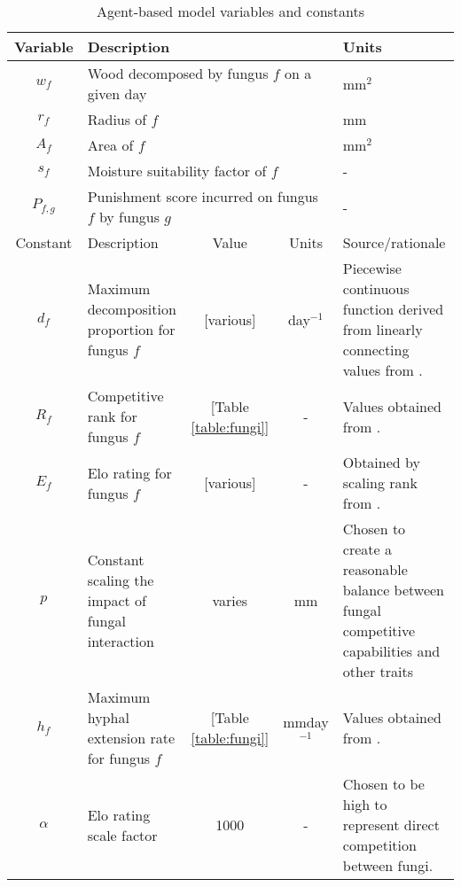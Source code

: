 \documentclass[12pt]{article}
\begin{document}

\begin{table}[!ht]
\centering
\caption{Agent-based model variables and constants}
\begin{tabular}[t]{cp{2in}ccp{1.8in}}
\hline
Variable &\multicolumn{3}{l}{Description}&Units\\
\hline
$w_f$&\multicolumn{3}{l}{Wood decomposed by fungus $f$ on a given day } &mm$^{2}$\\
$r_f$&\multicolumn{3}{l}{Radius of $f$}& mm\\
$A_f$&\multicolumn{3}{l}{Area of $f$}&mm$^2$\\
$s_f$&\multicolumn{3}{l}{Moisture suitability factor of $f$}&-\\  
$P_{f,g}$&\multicolumn{3}{l}{Punishment score incurred on fungus $f$ by fungus $g$}&-\\
\hline
Constant &Description&Value&Units&Source/rationale\\
\hline
$d_f$&Maximum decomposition proportion for fungus $f$ & [various] & day$^{-1}$ & Piecewise continuous function derived from linearly connecting values from \cite{trait-based}. \\
$R_f$&Competitive rank for fungus $f$ &[Table \ref{table:fungi}]&-&Values obtained from \cite{consistent_tradeoffs}.\\
$E_f$&Elo rating for fungus $f$ &[various]&-&Obtained by scaling rank from
\cite{consistent_tradeoffs}.\\
$p$&Constant scaling the impact of fungal interaction & varies & mm & Chosen to create a reasonable balance between fungal competitive capabilities and other traits \\
$h_f$&Maximum hyphal extension rate for fungus $f$ & [Table \ref{table:fungi}] & mm\;day$^{-1}$ & Values obtained from \cite{consistent_tradeoffs}.\\
$\alpha$ & Elo rating scale factor & 1000 & - & Chosen to be high to represent direct competition between fungi.
\end{tabular}
\label{table:ABMt}
\end{table}


\end{document}
